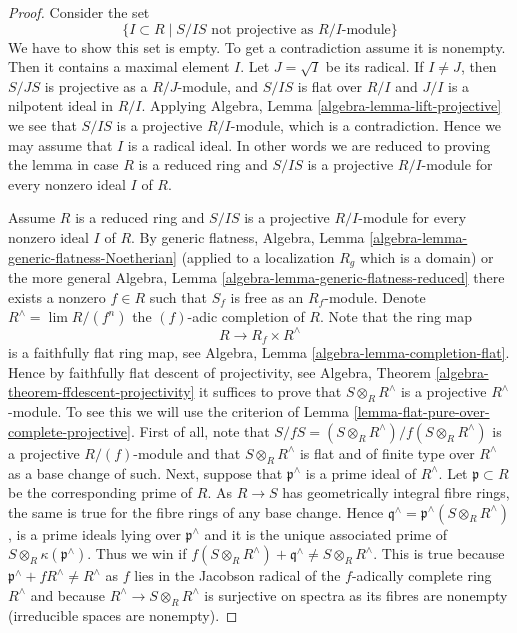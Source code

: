 \begin{proof}
Consider the set
$$
\{I \subset R \mid S/IS\text{ not projective as }R/I\text{-module}\}
$$
We have to show this set is empty. To get a contradiction assume it is
nonempty. Then it contains a maximal element $I$.
Let $J = \sqrt{I}$ be its radical. If $I \not = J$, then
$S/JS$ is projective as a $R/J$-module, and $S/IS$ is flat over $R/I$
and $J/I$ is a nilpotent ideal in $R/I$. Applying
Algebra, Lemma \ref{algebra-lemma-lift-projective}
we see that $S/IS$ is a projective $R/I$-module, which is a contradiction.
Hence we may assume that $I$ is a radical ideal. In other words we
are reduced to proving the lemma in case $R$ is a reduced ring and
$S/IS$ is a projective $R/I$-module for every nonzero ideal $I$
of $R$.

\medskip\noindent
Assume $R$ is a reduced ring and $S/IS$ is a projective $R/I$-module
for every nonzero ideal $I$ of $R$. By generic flatness,
Algebra, Lemma \ref{algebra-lemma-generic-flatness-Noetherian}
(applied to a localization $R_g$ which is a domain) or the more general
Algebra, Lemma \ref{algebra-lemma-generic-flatness-reduced}
there exists a nonzero $f \in R$ such that $S_f$ is free as an
$R_f$-module. Denote $R^\wedge = \lim R/(f^n)$ the $(f)$-adic completion
of $R$. Note that the ring map
$$
R \longrightarrow R_f \times R^\wedge
$$
is a faithfully flat ring map, see
Algebra, Lemma \ref{algebra-lemma-completion-flat}.
Hence by faithfully flat descent of projectivity, see
Algebra, Theorem \ref{algebra-theorem-ffdescent-projectivity}
it suffices to prove that $S \otimes_R R^\wedge$ is a projective
$R^\wedge$-module. To see this we will use the criterion of
Lemma \ref{lemma-flat-pure-over-complete-projective}.
First of all, note that $S/fS = (S \otimes_R R^\wedge)/f(S \otimes_R R^\wedge)$
is a projective $R/(f)$-module and that $S \otimes_R R^\wedge$ is flat
and of finite type over $R^\wedge$ as a base change of such.
Next, suppose that $\mathfrak p^\wedge$ is a prime ideal
of $R^\wedge$. Let $\mathfrak p \subset R$ be the corresponding prime
of $R$. As $R \to S$ has geometrically integral fibre rings, the
same is true for the fibre rings of any base change. Hence
$\mathfrak q^\wedge = \mathfrak p^\wedge(S \otimes_R R^\wedge)$,
is a prime ideals lying over $\mathfrak p^\wedge$
and it is the unique associated prime of
$S \otimes_R \kappa(\mathfrak p^\wedge)$. Thus we win if
$f(S \otimes_R R^\wedge) + \mathfrak q^\wedge \not = S \otimes_R R^\wedge$.
This is true because $\mathfrak p^\wedge + fR^\wedge \not = R^\wedge$ as
$f$ lies in the Jacobson radical of the $f$-adically complete ring $R^\wedge$
and because $R^\wedge \to S \otimes_R R^\wedge$ is surjective on spectra
as its fibres are nonempty (irreducible spaces are nonempty).
\end{proof}

